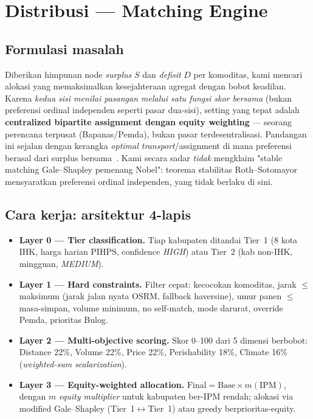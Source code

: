 \documentclass[11pt,a4paper]{article}
\begin{document}
\section{Distribusi --- Matching Engine}

\subsection{Formulasi masalah}
Diberikan himpunan node \emph{surplus} $S$ dan \emph{defisit} $D$ per komoditas, kami mencari
alokasi yang memaksimalkan kesejahteraan agregat dengan bobot keadilan. Karena \emph{kedua sisi
menilai pasangan melalui satu fungsi skor bersama} (bukan preferensi ordinal independen seperti
pasar dua-sisi), setting yang tepat adalah \textbf{centralized bipartite assignment dengan equity
weighting} --- seorang perencana terpusat (Bapanas/Pemda), bukan pasar terdesentralisasi.
Pandangan ini sejalan dengan kerangka \emph{optimal transport}/assignment di mana preferensi
berasal dari surplus bersama~\cite{galichon2021}. Kami secara sadar \emph{tidak} mengklaim
"stable matching Gale--Shapley pemenang Nobel": teorema stabilitas Roth--Sotomayor~\cite{roth1990}
mensyaratkan preferensi ordinal independen, yang tidak berlaku di sini.

\subsection{Cara kerja: arsitektur 4-lapis}
\begin{itemize}
  \item \textbf{Layer 0 --- Tier classification.} Tiap kabupaten ditandai Tier~1 (8 kota IHK,
        harga harian PIHPS, confidence \emph{HIGH}) atau Tier~2 (kab non-IHK, mingguan, \emph{MEDIUM}).
  \item \textbf{Layer 1 --- Hard constraints.} Filter cepat: kecocokan komoditas, jarak $\leq$
        maksimum (jarak jalan nyata OSRM, fallback haversine), umur panen $\leq$ masa-simpan,
        volume minimum, no self-match, mode darurat, override Pemda, prioritas Bulog.
  \item \textbf{Layer 2 --- Multi-objective scoring.} Skor 0--100 dari 5 dimensi berbobot:
        Distance 22\%, Volume 22\%, Price 22\%, Perishability 18\%, Climate 16\%
        (\emph{weighted-sum scalarization}).
  \item \textbf{Layer 3 --- Equity-weighted allocation.} $\text{Final} = \text{Base} \times
        m(\text{IPM})$, dengan $m$ \emph{equity multiplier} untuk kabupaten ber-IPM rendah; alokasi
        via modified Gale--Shapley (Tier~1$\leftrightarrow$Tier~1) atau greedy berprioritas-equity.
\end{itemize}
\end{document}
